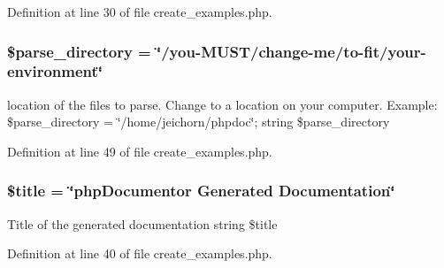 \-Definition at line 30 of file create\-\_\-examples.\-php.

\hypertarget{create__examples_8php_aade4270e4afac352f045c8f898357c8f}{
\subsubsection[{\$parse\-\_\-directory}]{\setlength{\rightskip}{0pt plus 5cm}\$parse\-\_\-directory = \char`\"{}/you-\/\-M\-U\-S\-T/change-\/me/to-\/fit/your-\/environment\char`\"{}}}\label{create__examples_8php_aade4270e4afac352f045c8f898357c8f}
location of the files to parse. \-Change to a location on your computer. \-Example\-: {\ttfamily  \$parse\-\_\-directory = \char`\"{}/home/jeichorn/phpdoc\char`\"{}; }  string \$parse\-\_\-directory 

\-Definition at line 49 of file create\-\_\-examples.\-php.

\hypertarget{create__examples_8php_ada57e7bb7c152edad18fe2f166188691}{
\subsubsection[{\$title}]{\setlength{\rightskip}{0pt plus 5cm}\$title = \char`\"{}php\-Documentor \-Generated \-Documentation\char`\"{}}}\label{create__examples_8php_ada57e7bb7c152edad18fe2f166188691}
\-Title of the generated documentation  string \$title 

\-Definition at line 40 of file create\-\_\-examples.\-php.

